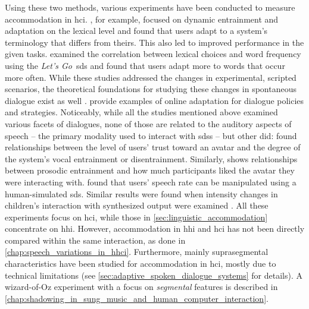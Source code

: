 Using these two methods, various experiments have been conducted to measure accommodation in \ac{hci}.
\citet{Bergqvist2020nontrivial, Lopes2011primes}, for example, focused on dynamic entrainment and adaptation on the lexical level and found that users adapt to a system's terminology that differs from theirs.
This also led to improved performance in the given tasks.
\citet{Parent2010lexical} examined the correlation between lexical choices and word frequency using the \emph{Let's Go}~\ac{sds} \citep{Raux2005letsgo} and found that users adapt more to words that occur more often.
While these studies addressed the changes in experimental, scripted scenarios, the theoretical foundations for studying these changes in spontaneous dialogue exist as well \citep{Brennan1996lexical}.
\citet{Gasic2013policy, Levin2000stochastic} provide examples of online adaptation for dialogue policies and strategies.
Noticeably, while all the studies mentioned above examined various facets of dialogues, none of those are related to the auditory aspects of speech -- the primary modality used to interact with \acp{sds} -- but other did:
\citet{Benus2018prosodic} found relationships between the level of users' trust toward an avatar and the degree of the system's vocal entrainment or disentrainment.
Similarly, \citet[][pp.~142-144]{Levitan2014acoustic} shows relationships between prosodic entrainment and how much participants liked the avatar they were interacting with.
\citet{Bell2003prosodic} found that users' speech rate can be manipulated using a human-simulated \ac{sds}.
Similar results were found when intensity changes in children's interaction with synthesized output were examined \citep{Coulston2002amplitude}.
All these experiments focus on \ac{hci}, while those in \cref{sec:linguistic_accommodation} concentrate on \ac{hhi}.
However, accommodation in \ac{hhi} and \ac{hci} has not been directly compared within the same interaction, as done in \cref{chap:speech_variations_in_hhci}.
Furthermore, mainly suprasegmental characteristics have been studied for accommodation in \ac{hci}, mostly due to technical limitations (see \cref{sec:adaptive_spoken_dialogue_systems} for details).
A wizard-of-Oz experiment with a focus on \emph{segmental} features is described in \cref{chap:shadowing_in_sung_music_and_human_computer_interaction}.